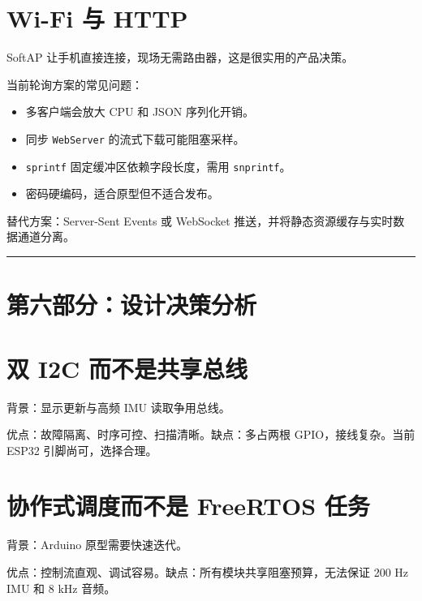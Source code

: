 \documentclass[
  UTF8,11pt,a4paper]{ctexart}
\newcommand{\passthrough}[1]{#1}
\providecommand{\tightlist}{%
  \setlength{\itemsep}{0pt}\setlength{\parskip}{0pt}}
\begin{document}
\section{Wi-Fi 与 HTTP}\label{wi-fi-ux4e0e-http}

SoftAP 让手机直接连接，现场无需路由器，这是很实用的产品决策。

当前轮询方案的常见问题：

\begin{itemize}
\tightlist
\item
  多客户端会放大 CPU 和 JSON 序列化开销。
\item
  同步 \passthrough{\lstinline!WebServer!} 的流式下载可能阻塞采样。
\item
  \passthrough{\lstinline!sprintf!} 固定缓冲区依赖字段长度，需用
  \passthrough{\lstinline!snprintf!}。
\item
  密码硬编码，适合原型但不适合发布。
\end{itemize}

替代方案：Server-Sent Events 或 WebSocket
推送，并将静态资源缓存与实时数据通道分离。

\begin{center}\rule{0.5\linewidth}{0.5pt}\end{center}

\section{第六部分：设计决策分析}\label{ux7b2cux516dux90e8ux5206ux8bbeux8ba1ux51b3ux7b56ux5206ux6790}

\section{双 I2C
而不是共享总线}\label{ux53cc-i2c-ux800cux4e0dux662fux5171ux4eabux603bux7ebf}

背景：显示更新与高频 IMU 读取争用总线。

优点：故障隔离、时序可控、扫描清晰。缺点：多占两根 GPIO，接线复杂。当前
ESP32 引脚尚可，选择合理。

\section{协作式调度而不是 FreeRTOS
任务}\label{ux534fux4f5cux5f0fux8c03ux5ea6ux800cux4e0dux662f-freertos-ux4efbux52a1}

背景：Arduino 原型需要快速迭代。

优点：控制流直观、调试容易。缺点：所有模块共享阻塞预算，无法保证 200 Hz
IMU 和 8 kHz 音频。
\end{document}
